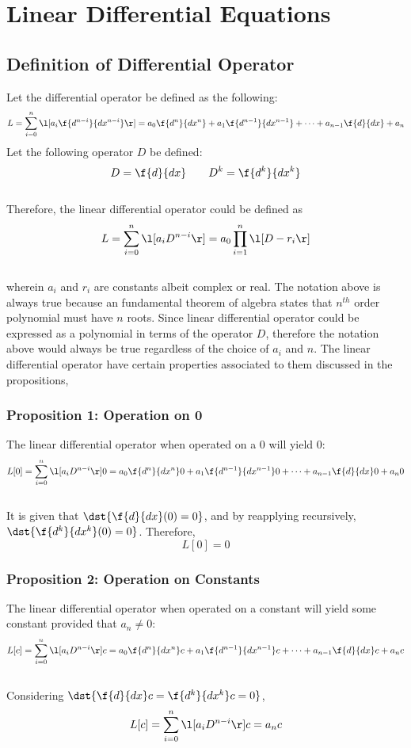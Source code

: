 \chapter{Linear Differential Equations}
\begin{comment}
\end{comment}
\section{Definition of Differential Operator}
\begin{comment}
\end{comment}
Let the differential operator be defined as the following: 
$$L = \sum_{i = 0}^{n}\l[a_i \f{d^{n - i}}{dx^{n - i}}\r] = a_0 \f{d^{n }}{dx^{n}} + a_1 \f{d^{n - 1}}{dx^{n - 1}}+ \dots + a_{n - 1}\f{d}{dx} + a_n$$
Let the following operator $D$ be defined:
$$D = \f{d}{dx} \qquad D^k = \f{d^k}{dx^k}$$
\\Therefore, the linear differential operator could be defined as 
$$L = \sum_{i = 0}^{n}\l[a_i D^{n - i}\r] = a_0\prod_{i = 1}^{n}\l[D - r_i\r]$$
\\wherein $a_i$ and $r_i$ are constants albeit complex or real. The notation above is always true because an fundamental theorem of algebra states that $n^{th}$ order polynomial must have $n$ roots. Since linear differential operator could be expressed as a polynomial in terms of the operator $D$, therefore the notation above would always be true regardless of the choice of $a_i$ and $n$. The linear differential operator have certain properties associated to them discussed in the propositions,
\subsection{Proposition 1: Operation on 0} 
\begin{comment}
\end{comment}
The linear differential operator when operated on a 0 will yield 0:
$$L[0]=\sum_{i = 0}^{n}\l[a_i D^{n - i}\r]0=a_0 \f{d^{n }}{dx^{n}}0 + a_1 \f{d^{n - 1}}{dx^{n - 1}}0+ \dots + a_{n - 1}\f{d}{dx}0 + a_n0$$ 
\\It is given that $\dst{\f{d}{dx}(0) = 0}$, and by reapplying recursively, $\dst{\f{d^k}{dx^k}(0) = 0}$. Therefore, 
$$L[0]=0$$
\subsection{Proposition 2: Operation on Constants}
\begin{comment}
\end{comment}
The linear differential operator when operated on a constant will yield some constant provided that $a_n \neq 0$:
$$L[c] = \sum_{i = 0}^{n}\l[a_i D^{n - i}\r]c = a_0 \f{d^{n }}{dx^{n}}c + a_1 \f{d^{n - 1}}{dx^{n - 1}}c+ \dots + a_{n - 1}\f{d}{dx}c + a_nc$$
\\Considering $\dst{\f{d}{dx}c = \f{d^k}{dx^k}c = 0}$,
$$L[c] = \sum_{i = 0}^{n}\l[a_i D^{n - i}\r]c = a_nc$$
